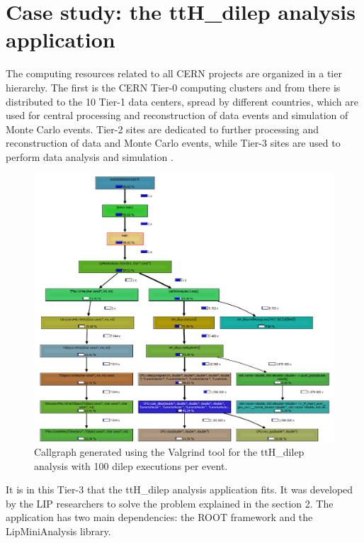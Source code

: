 
\chapter{Case study: the ttH\_dilep analysis application}

The computing resources related to all CERN projects are organized in a tier hierarchy. The first is the CERN Tier-0 computing clusters and from there is distributed to the 10 Tier-1 data centers, spread by different countries, which are used for central processing and reconstruction of data events and simulation of Monte Carlo events. Tier-2 sites are dedicated to further processing and reconstruction of data and Monte Carlo events, while Tier-3 sites are used to perform data analysis and simulation \cite{LIP:Ibergrid}.

\begin{figure}[!htp]
	\begin{center}
		\includegraphics[scale=0.6]{../../common/img/callgraph_O3_100dilep.png}
		\caption{Callgraph generated using the Valgrind tool \cite{Callgrind} for the ttH\_dilep analysis with 100 dilep executions per event.}
		\label{fig:callgraph}
	\end{center}
\end{figure}

It is in this Tier-3 that the ttH\_dilep analysis application fits. It was developed by the LIP researchers to solve the problem explained in the section 2. The application has two main dependencies: the ROOT framework \cite{CERN:ROOT} and the LipMiniAnalysis library.

